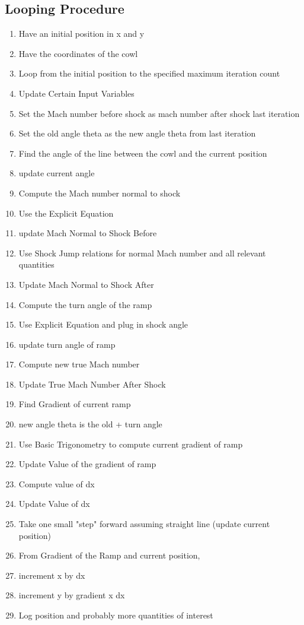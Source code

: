 \documentclass[a4paper, 12pt]{report}
\begin{document}
\begin{center}
\subsection{Looping Procedure}
\begin{comment}
\end{comment}
\begin{enumerate}
\item Have an initial position in x and y
\item Have the coordinates of the cowl
\item Loop from the initial position to the specified maximum iteration count
\item Update Certain Input Variables
\item Set the Mach number before shock as mach number after shock last iteration
\item Set the old angle theta as the new angle theta from last iteration
\item Find the angle of the line between the cowl and the current position
\item update current angle
\item Compute the Mach number normal to shock
\item Use the Explicit Equation
\item update Mach Normal to Shock Before
\item Use Shock Jump relations for normal Mach number and all relevant quantities
\item Update Mach Normal to Shock After
\item Compute the turn angle of the ramp
\item Use Explicit Equation and plug in shock angle
\item update turn angle of ramp
\item Compute new true Mach number
\item Update True Mach Number After Shock
\item Find Gradient of current ramp
\item new angle theta is the old + turn angle
\item Use Basic Trigonometry to compute current gradient of ramp
\item Update Value of the gradient of ramp
\item Compute value of dx
\item Update Value of dx
\item Take one small "step" forward assuming straight line (update current position)
\item From Gradient of the Ramp and current position,
\item increment x by dx
\item increment y by gradient x dx
\item Log position and probably more quantities of interest
\end{enumerate}


\end{center}
\end{document}
